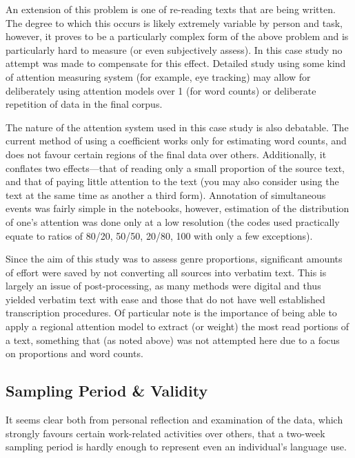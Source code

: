 An extension of this problem is one of re-reading texts that are being written.  The degree to which this occurs is likely extremely variable by person and task, however, it proves to be a particularly complex form of the above problem and is particularly hard to measure (or even subjectively assess).  In this case study no attempt was made to compensate for this effect.  Detailed study using some kind of attention measuring system (for example, eye tracking) may allow for deliberately using attention models over 1 (for word counts) or deliberate repetition of data in the final corpus.


The nature of the attention system used in this case study is also debatable.  The current method of using a coefficient works only for estimating word counts, and does not favour certain regions of the final data over others.  Additionally, it conflates two effects---that of reading only a small proportion of the source text, and that of paying little attention to the text (you may also consider using the text at the same time as another a third form).  Annotation of simultaneous events was fairly simple in the notebooks, however, estimation of the distribution of one's attention was done only at a low resolution (the codes used practically equate to ratios of 80/20, 50/50, 20/80, 100 with only a few exceptions).






Since the aim of this study was to assess genre proportions, significant amounts of effort were saved by not converting all sources into verbatim text.  This is largely an issue of post-processing, as many methods were digital and thus yielded verbatim text with ease and those that do not have well established transcription procedures.  Of particular note is the importance of being able to apply a regional attention model to extract (or weight) the most read portions of a text, something that (as noted above) was not attempted here due to a focus on proportions and word counts.






\subsection{Sampling Period \& Validity}
It seems clear both from personal reflection and examination of the data, which strongly favours certain work-related activities over others, that a two-week sampling period is hardly enough to represent even an individual's language use.

